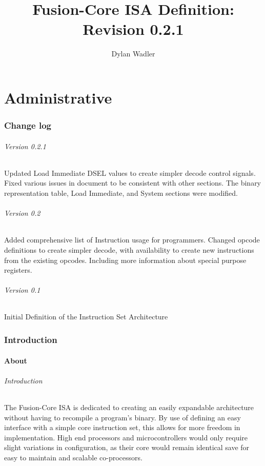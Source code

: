 \documentclass[letterpaper, 11pt]{article}
\title{Fusion-Core ISA Definition: Revision 0.2.1}
\author{Dylan Wadler}
\begin{document}
\maketitle
\newpage
\tableofcontents


\newpage
\part{Administrative}
\section{Change log}
\paragraph{Version 0.2.1} Updated Load Immediate DSEL values to create simpler decode control signals. Fixed various issues in document to be consistent with other sections. The binary representation table, Load Immediate, and System sections were modified.
\paragraph{Version 0.2} Added comprehensive list of Instruction usage for programmers. Changed opcode definitions to create simpler
decode, with availability to create new instructions from the existing opcodes. Including more information about special purpose registers.
\paragraph{Version 0.1} Initial Definition of the Instruction Set Architecture

\section{Introduction}

\subsection{About}
\paragraph{Introduction}The Fusion-Core ISA is dedicated to creating an easily expandable architecture without having to 
recompile a program's binary. By use of defining an easy interface with a simple core instruction set, this allows for
more freedom in implementation. High end processors and microcontrollers would only require slight variations in
configuration, as their core would remain identical save for easy to maintain and scalable co-processors.
\end{document}
